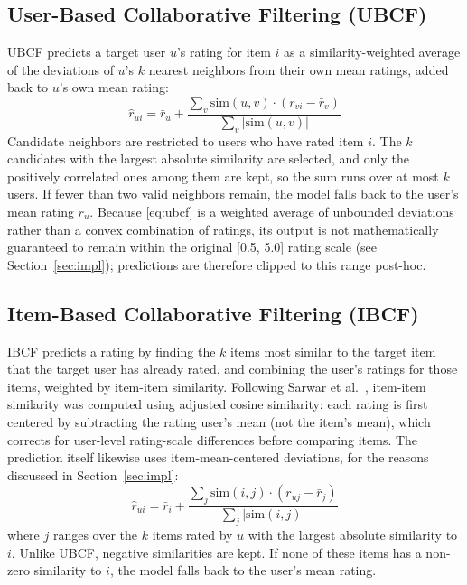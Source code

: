\documentclass[conference]{IEEEtran}
\begin{document}
\subsection{User-Based Collaborative Filtering (UBCF)}
UBCF predicts a target user $u$'s rating for item $i$ as a similarity-weighted average of the deviations of $u$'s $k$ nearest neighbors from their own mean ratings, added back to $u$'s own mean rating:
\begin{equation}
\hat{r}_{ui} = \bar{r}_u + \frac{\sum_{v} \mathrm{sim}(u,v)\cdot(r_{vi} - \bar{r}_v)}{\sum_{v} |\mathrm{sim}(u,v)|}
\label{eq:ubcf}
\end{equation}
Candidate neighbors are restricted to users who have rated item $i$. The $k$ candidates with the largest absolute similarity are selected, and only the positively correlated ones among them are kept, so the sum runs over at most $k$ users. If fewer than two valid neighbors remain, the model falls back to the user's mean rating $\bar{r}_u$. Because \eqref{eq:ubcf} is a weighted average of unbounded deviations rather than a convex combination of ratings, its output is not mathematically guaranteed to remain within the original [0.5, 5.0] rating scale (see Section~\ref{sec:impl}); predictions are therefore clipped to this range post-hoc.

\subsection{Item-Based Collaborative Filtering (IBCF)}
\label{sec:ibcf}
IBCF predicts a rating by finding the $k$ items most similar to the target item that the target user has already rated, and combining the user's ratings for those items, weighted by item-item similarity. Following Sarwar et al.~\cite{sarwar2001}, item-item similarity was computed using adjusted cosine similarity: each rating is first centered by subtracting the rating user's mean (not the item's mean), which corrects for user-level rating-scale differences before comparing items. The prediction itself likewise uses item-mean-centered deviations, for the reasons discussed in Section~\ref{sec:impl}:
\begin{equation}
\hat{r}_{ui} = \bar{r}_i + \frac{\sum_{j} \mathrm{sim}(i,j)\cdot(r_{uj} - \bar{r}_j)}{\sum_{j} |\mathrm{sim}(i,j)|}
\label{eq:ibcf}
\end{equation}
where $j$ ranges over the $k$ items rated by $u$ with the largest absolute similarity to $i$. Unlike UBCF, negative similarities are kept. If none of these items has a non-zero similarity to $i$, the model falls back to the user's mean rating.
\end{document}
